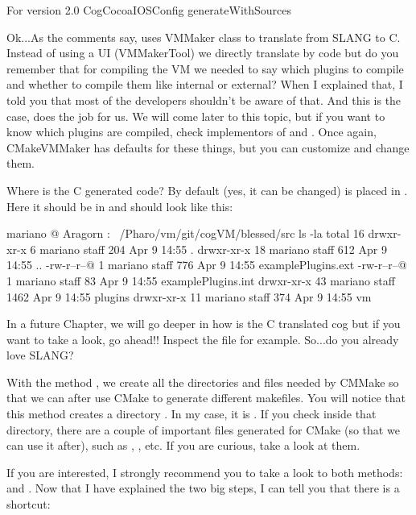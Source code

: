 \documentclass[a4paper,10pt,twoside]{book}
\begin{document}
\begin{code}{For version 2.0}
CogCocoaIOSConfig generateWithSources
\end{code}



Ok...As the comments say,  uses VMMaker class to translate from SLANG to C. Instead of using a UI (VMMakerTool) we directly translate by code but do you remember that for compiling the VM we needed to say which plugins to compile and whether to compile them like internal or external? When I explained that, I told you that most of the developers shouldn't be aware of that. And this is the case,  does the job for us. We will come later to this topic, but if you want to know which plugins are compiled, check implementors of  and . Once again, CMakeVMMaker has defaults for these things, but you can customize and change them.

Where is the C generated code? By default (yes, it can be changed) is placed in . Here it should be in  and should look like this:

\begin{code}{}
mariano @ Aragorn : ~/Pharo/vm/git/cogVM/blessed/src
ls -la
total 16
drwxr-xr-x   6 mariano  staff   204 Apr  9 14:55 .
drwxr-xr-x  18 mariano  staff   612 Apr  9 14:55 ..
-rw-r--r--@  1 mariano  staff   776 Apr  9 14:55 examplePlugins.ext
-rw-r--r--@  1 mariano  staff    83 Apr  9 14:55 examplePlugins.int
drwxr-xr-x  43 mariano  staff  1462 Apr  9 14:55 plugins
drwxr-xr-x  11 mariano  staff   374 Apr  9 14:55 vm
\end{code}


In a future Chapter, we will go deeper in how is the C translated cog but if you want to take a look, go ahead!! Inspect the file   for example. So...do you already love SLANG? 

With the method , we create all the directories and files needed by CMMake so that we can after use CMake to generate different makefiles. You will notice that this method creates a directory . In my case, it is . If you check inside that directory, there are a couple of important files generated for CMake (so that we can use it after), such as , , etc. If you are curious, take a look at them.

If you are interested, I strongly recommend you to take a look to both methods:  and . Now that I have explained the two big steps, I can tell you that there is a shortcut:
\end{document}
